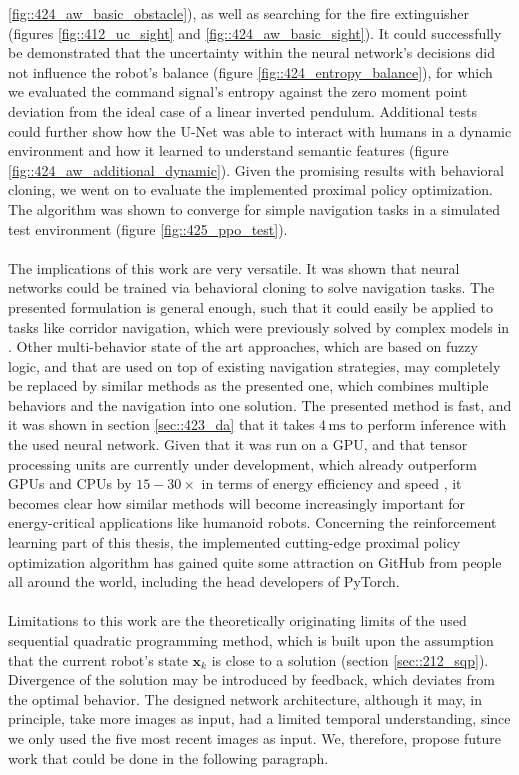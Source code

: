 \ref{fig::424_aw_basic_obstacle}), as well as searching for the fire extinguisher (figures \ref{fig::412_uc_sight} and \ref{fig::424_aw_basic_sight}). It could successfully be demonstrated that the uncertainty within the neural network's decisions did not influence the robot's balance (figure \ref{fig::424_entropy_balance}), for which we evaluated the command signal's entropy against the zero moment point deviation from the ideal case of a linear inverted pendulum. Additional tests could further show how the U-Net was able to interact with humans in a dynamic environment and how it learned to understand semantic features (figure \ref{fig::424_aw_additional_dynamic}). Given the promising results with behavioral cloning, we went on to evaluate the implemented proximal policy optimization. The algorithm was shown to converge for simple navigation tasks in a simulated test environment (figure \ref{fig::425_ppo_test}).
\\\\
The implications of this work are very versatile. It was shown that neural networks could be trained via behavioral cloning to solve navigation tasks. The presented formulation is general enough, such that it could easily be applied to tasks like corridor navigation, which were previously solved by complex models in \cite{faragasso2013vision}. Other multi-behavior state of the art approaches, which are based on fuzzy logic, and that are used on top of existing navigation strategies, may completely be replaced by similar methods as the presented one, which combines multiple behaviors and the navigation into one solution. The presented method is fast, and it was shown in section \ref{sec::423_da} that it takes $4\,\text{ms}$ to perform inference with the used neural network. Given that it was run on a GPU, and that tensor processing units are currently under development, which already outperform GPUs and CPUs by $15-30\times$ in terms of energy efficiency and speed \cite{jouppi2017datacenter}, it becomes clear how similar methods will become increasingly important for energy-critical applications like humanoid robots. Concerning the reinforcement learning part of this thesis, the implemented cutting-edge proximal policy optimization algorithm has gained quite some attraction on GitHub from people all around the world, including the head developers of PyTorch.
\\\\
Limitations to this work are the theoretically originating limits of the used sequential quadratic programming method, which is built upon the assumption that the current robot's state $\bm{x}_k$ is close to a solution (section \ref{sec::212_sqp}). Divergence of the solution may be introduced by feedback, which deviates from the optimal behavior. The designed network architecture, although it may, in principle, take more images as input, had a limited temporal understanding, since we only used the five most recent images as input. We, therefore, propose future work that could be done in the following paragraph.
